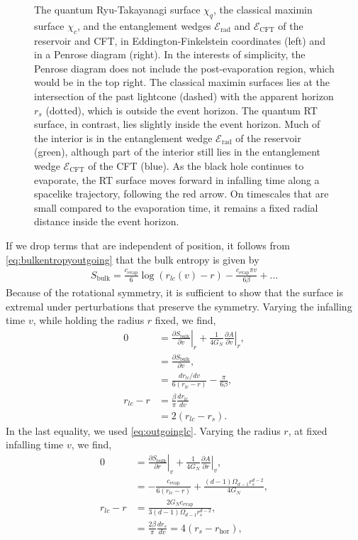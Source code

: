 \documentclass[11pt,a4paper]{article}
\begin{document}
\begin{figure}[t]
\caption{The quantum Ryu-Takayanagi surface $\chi_q$, the classical maximin surface $\chi_c$, and the entanglement wedges $\mathcal{E}_\text{rad}$ and $\mathcal{E}_\text{CFT}$ of the reservoir and CFT, in Eddington-Finkelstein coordinates (left) and in a Penrose diagram (right). In the interests of simplicity, the Penrose diagram does not include the post-evaporation region, which would be in the top right. The classical maximin surfaces lies at the intersection of the past lightcone (dashed) with the apparent horizon $r_s$ (dotted), which is outside the event horizon. The quantum RT surface, in contrast, lies slightly inside the event horizon. Much of the interior is in the entanglement wedge $\mathcal{E}_\text{rad}$ of the reservoir (green), although part of the interior still lies in the entanglement wedge $\mathcal{E}_\text{CFT}$ of the CFT (blue). As the black hole continues to evaporate, the RT surface moves forward in infalling time along a spacelike trajectory, following the red arrow. On timescales that are small compared to the evaporation time, it remains a fixed radial distance inside the event horizon.}
\label{fig:bh_eddington}
\end{figure}
If we drop terms that are independent of position, it follows from \eqref{eq:bulkentropyoutgoing} that the bulk entropy is given by
\begin{align} \label{eq:outgoingentropy}
S_\text{bulk} =  \frac{c_\text{evap}}{6}\log\left(r_{lc}(v) - r\right) - \frac{c_\text{evap} \pi v}{6 \beta} + \dots
\end{align}
Because of the rotational symmetry, it is sufficient to show that the surface is extremal under perturbations that preserve the symmetry. Varying the infalling time $v$, while holding the radius $r$ fixed, we find,
\begin{align}
0 &= \left. \frac{\partial S_\text{bulk}}{\partial v} \right|_r + \frac{1}{4G_N} \left. \frac{\partial A}{\partial v}\right|_r,
\\& = \frac{\partial S_\text{bulk}}{\partial v},
\\& = \frac{d r_{lc}/d v}{6(r_{lc} - r)} - \frac{\pi}{6 \beta},
\\r_{lc} - r & = \frac{\beta}{\pi}\frac{d r_{lc}}{d v}
\\& = 2(r_{lc} - r_s).  \label{eq:dSdv}
\end{align}
In the last equality, we used \eqref{eq:outgoinglc}. Varying the radius $r$, at fixed infalling time $v$, we find,
\begin{align}
0 &= \left. \frac{\partial S_\text{bulk} }{\partial r}\right|_v + \frac{1}{4G_N} \left.\frac{\partial A}{\partial r}\right|_v,
\\&= -\frac{c_\text{evap}}{6(r_{lc} - r)} + \frac{(d-1)\Omega_{d-1} r_s^{d-2}}{4G_N},
\\r_{lc} - r &=\frac{2G_N c_\text{evap}}{3(d-1) \Omega_{d-1} r_s^{d-2}}, \label{eq:dSdr}
\\&= \frac{2\beta}{\pi} \frac{d r_s}{d v} = 4(r_s - r_\text{hor}), \label{eq:rlcr=4rsrhor}
\end{align}
\end{document}
